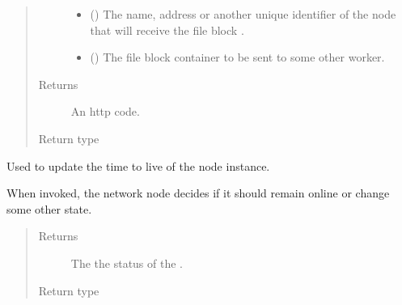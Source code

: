 \documentclass[letterpaper,10pt,english]{sphinxmanual}
\begin{document}
\begin{fulllineitems}
\begin{fulllineitems}
\begin{quote}
\begin{description}
\begin{itemize}
\item {} 
 () \textendash{} The name, address or another unique identifier of the node
that will receive the file block .

\item {} 
 ({\hyperref[\detokenize{app.domain.helpers:app.domain.helpers.smart_dataclasses.FileBlockData}]{}}) \textendash{} The file block container to be sent to some other worker.

\end{itemize}

\item[{Returns}] \leavevmode
An http code.

\item[{Return type}] \leavevmode
{\hyperref[\detokenize{app.domain.helpers:app.domain.helpers.enums.HttpCodes}]{}}

\end{description}\end{quote}

\end{fulllineitems}


\begin{fulllineitems}
\label{\detokenize{app.domain:app.domain.network_nodes.Node.update_status}}
Used to update the time to live of the node instance.

When invoked, the network node decides if it should remain online or
change some other state.
\begin{quote}\begin{description}
\item[{Returns}] \leavevmode
The the status of the .

\item[{Return type}] \leavevmode
{\hyperref[\detokenize{app.domain.helpers:app.domain.helpers.enums.Status}]{}}

\end{description}\end{quote}

\end{fulllineitems}


\end{fulllineitems}
\end{document}
